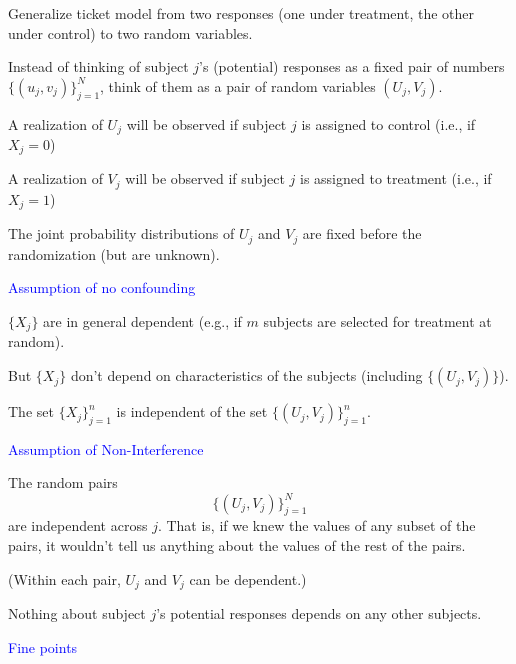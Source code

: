 \documentclass[landscape]{slides}
\newcommand{\beq}{\begin{equation}}
\newcommand{\eeq}{\end{equation}}
\begin{document}
\begin{slide}
\begin{slide}
Generalize ticket model from two responses (one under treatment, the other under
control) to two random variables.

Instead of thinking of subject $j$'s (potential)
responses as a fixed pair of numbers $\{(u_j, v_j)\}_{j=1}^N$,
think of them as a pair of random variables $(U_j, V_j)$.

A realization of $U_j$ will be observed if subject $j$ is assigned to control (i.e., if $X_j = 0$)

A realization of $V_j$ will be observed if subject $j$ is assigned to treatment (i.e., if $X_j = 1$)

The joint probability distributions of $U_j$ and $V_j$ are fixed before the
randomization (but are unknown).

\end{slide}

\begin{slide}{\textcolor{blue}{Assumption of no confounding}}

$\{X_j\}$ are in general dependent (e.g., if $m$ subjects are selected for
treatment at random).  

But $\{ X_j \}$ don't depend on characteristics
of the subjects (including $\{(U_j, V_j)\}$).

The set $\{X_j\}_{j=1}^n$ is independent of the set $\{ (U_j, V_j)\}_{j=1}^n$.

\end{slide}

\begin{slide}{\textcolor{blue}{Assumption of Non-Interference}}

The random pairs 
\beq
   \{ (U_j, V_j) \}_{j=1}^N 
\eeq
are independent across $j$.
That is, if we knew the values of any subset of the pairs, it wouldn't tell
us anything about the values of the rest of the pairs.

(Within each pair, $U_j$ and $V_j$ can be dependent.)

Nothing about subject $j$'s potential responses depends on any other
subjects.

\end{slide}

\begin{slide}
{\textcolor{blue}{Fine points}}


\end{slide}
\end{slide}
\end{document}
